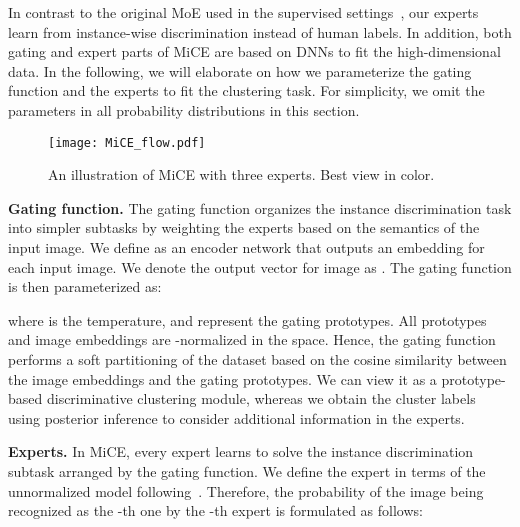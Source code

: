 \documentclass{article} \usepackage{iclr2021_conference,times}
\begin{document}
In contrast to the original MoE used in the supervised settings~\citep{jacobs1991adaptive}, our experts learn from instance-wise discrimination
instead of human labels.
In addition, both gating and expert parts of MiCE are based on DNNs to fit the high-dimensional data. In the following, we will elaborate on how we parameterize the gating function and the experts to fit the clustering task. For simplicity, we omit the parameters in all probability distributions in this section. 






































\begin{figure}
    \centering
    \texttt{[image: MiCE\_flow.pdf]}
    \caption{An illustration of MiCE with three experts. Best view in color.}
    \label{fig:MiCE}
\end{figure}
{\bf Gating function.} The gating function organizes the instance discrimination task into  simpler subtasks by weighting the experts based on the semantics of the input image.
We define  as an encoder network that outputs an embedding for each input image. We denote the output vector for image  as . The gating function is then parameterized as:

where  is the temperature, and  represent the gating prototypes. All prototypes and image embeddings are -normalized in the  space. Hence, the gating function performs a soft partitioning of the dataset based on the cosine similarity between the image embeddings and the gating prototypes. We can view it as a prototype-based discriminative clustering module, whereas we obtain the cluster labels using posterior inference to consider additional information in the experts.




{\bf Experts.} In MiCE, every expert learns to solve the instance discrimination subtask arranged by the gating function. We define the expert 
in terms of the unnormalized model  following~\citet{wu2018unsupervised,he2019momentum}. Therefore,  
the probability of the image  being recognized as the -th one by the -th expert is formulated as follows:
\end{document}
